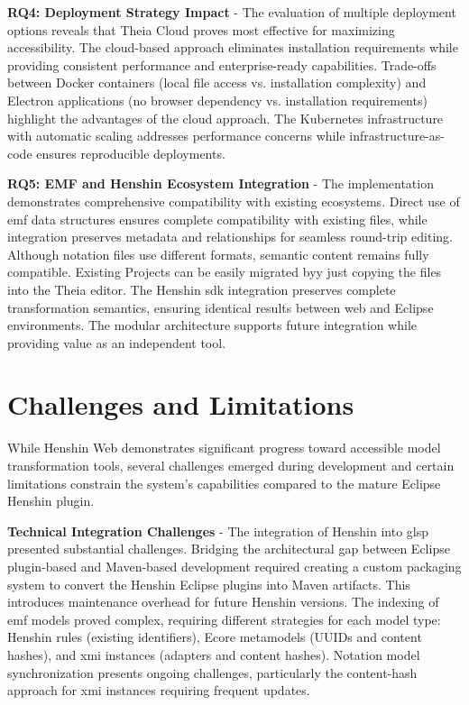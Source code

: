   \textbf{RQ4: Deployment Strategy Impact} - The evaluation of multiple deployment options reveals that Theia Cloud proves most effective for maximizing accessibility. The cloud-based approach eliminates installation requirements while providing consistent performance and enterprise-ready capabilities. Trade-offs between Docker containers (local file access vs. installation complexity) and Electron applications (no browser dependency vs. installation requirements) highlight the advantages of the cloud approach. The Kubernetes infrastructure with automatic scaling addresses performance concerns while infrastructure-as-code ensures reproducible deployments.

  \textbf{RQ5: EMF and Henshin Ecosystem Integration} - The implementation demonstrates comprehensive compatibility with existing ecosystems. Direct use of \ac{emf} data structures ensures complete compatibility with existing files, while  integration preserves metadata and relationships for seamless round-trip editing. Although notation files use different formats, semantic content remains fully compatible. Existing Projects can be easily migrated byy just copying the files into the Theia editor. The Henshin \ac{sdk} integration preserves complete transformation semantics, ensuring identical results between web and Eclipse environments. The modular architecture supports future integration while providing value as an independent tool.

  \section{Challenges and Limitations}
  \label{subsec:challenges-limitations}

  While Henshin Web demonstrates significant progress toward accessible model transformation tools, several challenges emerged during development and certain limitations constrain the system's capabilities compared to the mature Eclipse Henshin plugin.

  \textbf{Technical Integration Challenges} - The integration of Henshin into \ac{glsp} presented substantial challenges. Bridging the architectural gap between Eclipse plugin-based and Maven-based development required creating a custom packaging system to convert the Henshin Eclipse plugins into Maven artifacts. This introduces maintenance overhead for future Henshin versions. The indexing of \ac{emf} models proved complex, requiring different strategies for each model type: Henshin rules (existing identifiers), Ecore metamodels (UUIDs and content hashes), and \ac{xmi} instances (adapters and content hashes). Notation model synchronization presents ongoing challenges, particularly the content-hash approach for \ac{xmi} instances requiring frequent updates.

